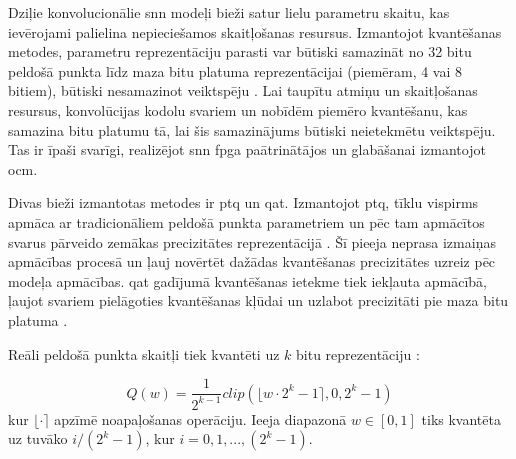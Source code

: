 

Dziļie konvolucionālie \Gls{snn} modeļi bieži satur lielu parametru skaitu, kas ievērojami palielina nepieciešamos
skaitļošanas resursus.
Izmantojot kvantēšanas metodes, parametru reprezentāciju parasti var būtiski samazināt no 32 bitu
peldošā punkta līdz maza bitu platuma reprezentācijai (piemēram, 4 vai 8 bitiem), būtiski nesamazinot veiktspēju
\cite{wei2024}. Lai taupītu atmiņu un skaitļošanas resursus, konvolūcijas kodolu svariem un nobīdēm piemēro kvantēšanu, kas
samazina bitu platumu tā, lai šis samazinājums būtiski neietekmētu veiktspēju. Tas ir īpaši svarīgi, realizējot \Gls{snn}
\Gls{fpga} paātrinātājos un glabāšanai izmantojot \Gls{ocm}.

Divas bieži izmantotas metodes ir \Gls{ptq} un \Gls{qat}. Izmantojot \Gls{ptq}, tīklu vispirms apmāca ar tradicionāliem
peldošā punkta parametriem un pēc tam apmācītos svarus pārveido zemākas precizitātes reprezentācijā \cite{zhou2016}. Šī
pieeja neprasa izmaiņas apmācības procesā un ļauj novērtēt dažādas kvantēšanas precizitātes uzreiz pēc modeļa apmācības.
\Gls{qat} gadījumā kvantēšanas ietekme tiek iekļauta apmācībā, ļaujot svariem pielāgoties kvantēšanas kļūdai un uzlabot
precizitāti pie maza bitu platuma \cite{zhou2016, plagwitz2024}.

Reāli peldošā punkta skaitļi tiek kvantēti uz $k$ bitu reprezentāciju \cite{zhou2016}:

\begin{equation}
  Q(w) =  \frac{1}{2^{k - 1}} clip(\lfloor w \cdot 2^{k}-1 \rceil, 0, 2^{k}-1)
\end{equation}
kur \(\lfloor \cdot \rceil\) apzīmē noapaļošanas operāciju. Ieeja diapazonā \(w \in [0, 1]\) tiks kvantēta uz tuvāko \(i / (2^{k} - 1)\), kur \(i = 0, 1, ..., (2^{k} - 1)\).



